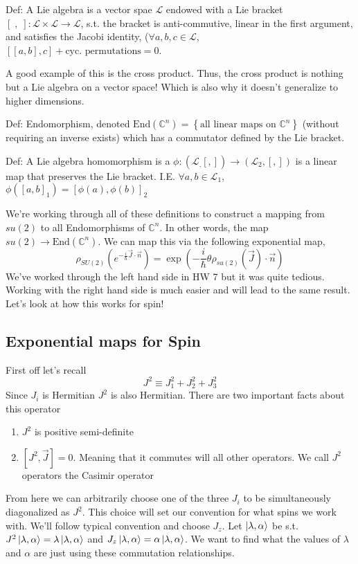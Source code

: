 Def: A Lie algebra is a vector spae $\mathcal{L}$ endowed with a Lie bracket 
$[\;,\;]: \mathcal{L} \times \mathcal{L} \rightarrow \mathcal{L}$, s.t.
the bracket is anti-commutive, linear in the first argument, and 
satisfies the Jacobi identity, ($\forall a, b, c \in \mathcal{L}$,
$\left[\left[a, b\right], c\right] + \text{cyc. permutations} = 0$.

A good example of this is the cross product. Thus, the cross product is nothing
but a Lie algebra on a vector space! Which is also why it doesn't generalize to higher
dimensions.

Def: Endomorphism, denoted 
$\text{End}(\mathbb{C}^n) = \left\{\text{all linear maps on } \mathbb{C}^n\right\}$
(without requiring an inverse exists) which has a commutator defined by the Lie bracket.

Def: A Lie algebra homomorphism is a $\phi: \left(\mathcal{L}_, \left[,\right]\right) \rightarrow
 \left(\mathcal{L}_2, \left[,\right]\right)$ is a linear map
that preserves the Lie bracket. I.E. $\forall a, b \in \mathcal{L}_1$,
$\phi \left(\left[a, b\right]_1\right) = \left[\phi \left(a\right), \phi(b)\right]_2$

We're working through all of these definitions to construct a mapping from
$su(2)$ to all Endomorphisms of $\mathbb{C}^n$. In other words,
the map $su(2) \rightarrow \text{End} \left(\mathbb{C}^n\right)$. We can map this
via the following exponential map,
$$
\rho_{SU(2)} \left(e^{- \frac{i}{\hbar} \vec{J} \cdot \vec{n}}\right) =
    \exp \left(- \frac{i}{\hbar} \theta \rho_{su(2)} \left(\vec{J}\right) \cdot \vec{n}\right)
$$
We've worked through the left hand side in HW 7 but it was quite tedious. Working with the
right hand side is much easier and will lead to the same result. Let's look at how this
works for spin!

\subsection{Exponential maps for Spin}
First off let's recall
$$
    J^2 \equiv J_1^2 + J_2^2 + J_3^2
$$
Since $J_i$ is Hermitian $J^2$ is also Hermitian. There are two important facts about this
operator
\begin{enumerate}
    \item $J^2$ is positive semi-definite
    \item $\left[J^2, \vec{J}\right] = 0$. Meaning that it commutes will all other operators.
        We call $J^2$ operators the Casimir operator
\end{enumerate}
From here we can arbitrarily choose one of the three $J_i$ to be simultaneously diagonalized
as $J^2$. This choice will set our convention for what spins we work with. We'll follow
typical convention and choose $J_z$. Let $\Ket{\lambda,\alpha}$ be s.t.
$J^2 \Ket{\lambda,\alpha} = \lambda \Ket{\lambda,\alpha}$ and 
$J_z \Ket{\lambda,\alpha} = \alpha \Ket{\lambda,\alpha}$. We want to find what
the values of $\lambda$ and $\alpha$ are just using these commutation relationships.

